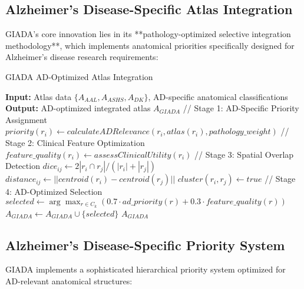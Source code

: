\documentclass[a4paper,11pt]{article}
\begin{document}
\subsection{Alzheimer's Disease-Specific Atlas Integration}

GIADA's core innovation lies in its **pathology-optimized selective integration methodology**, which implements anatomical priorities specifically designed for Alzheimer's disease research requirements:

\begin{algorithm}
\caption{GIADA AD-Optimized Atlas Integration}
\begin{algorithmic}[1]
\STATE \textbf{Input:} Atlas data $\{A_{AAL}, A_{ASHS}, A_{DK}\}$, AD-specific anatomical classifications
\STATE \textbf{Output:} AD-optimized integrated atlas $A_{GIADA}$
\STATE 
\STATE // Stage 1: AD-Specific Priority Assignment
    \STATE $priority(r_i) \leftarrow calculateADRelevance(r_i, atlas(r_i), pathology\_weight)$
\ENDFOR
\STATE 
\STATE // Stage 2: Clinical Feature Optimization
    \STATE $feature\_quality(r_i) \leftarrow assessClinicalUtility(r_i)$
\ENDFOR
\STATE 
\STATE // Stage 3: Spatial Overlap Detection
    \STATE $dice_{ij} \leftarrow 2|r_i \cap r_j| / (|r_i| + |r_j|)$
    \STATE $distance_{ij} \leftarrow ||centroid(r_i) - centroid(r_j)||$
        \STATE $cluster(r_i, r_j) \leftarrow true$
    \ENDIF
\ENDFOR
\STATE 
\STATE // Stage 4: AD-Optimized Selection
    \STATE $selected \leftarrow \arg\max_{r \in C_k} (0.7 \cdot ad\_priority(r) + 0.3 \cdot feature\_quality(r))$
    \STATE $A_{GIADA} \leftarrow A_{GIADA} \cup \{selected\}$
\ENDFOR
\RETURN $A_{GIADA}$
\end{algorithmic}
\end{algorithm}

\subsection{Alzheimer's Disease-Specific Priority System}

GIADA implements a sophisticated hierarchical priority system optimized for AD-relevant anatomical structures:
\end{document}
